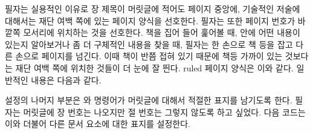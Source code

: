 필자는 실용적인 이유로 장 제목이 머릿글에 적어도 페이지 중앙에, 기술적인 저술에
대해서는 재단 여백 쪽에 있는 페이지 양식을 선호한다.
필자는 또한 페이지 번호가 바깥쪽 모서리에 위치하는 것을 선호한다.
책을 집어 들어 훑어볼 때, 안에 어떤 내용이 있는지 알아보거나 좀 더 구체적인
내용을 찾을 때, 필자는 한 손으로 책 등을 잡고 다른 손으로 페이지를 넘긴다.
이때 책이 반쯤 접혀 있기 때문에 책등 가까이 있는 것보다는 재단 여백 쪽에 위치한
것들이 더 눈에 잘 띈다.
ruled 페이지 양식은 이와 같다.
일반적인 내용은 다음과 같다.
\begin{lcode}
\end{lcode}
설정의 나머지 부분은 \cmd{\chapter}와 \cmd{\section} 명령어가 머릿글에 대해서
적절한 표지를 남기도록 한다.
필자는 머릿글에 장 번호는 나오지만 절 번호는 그렇지 않도록 하고 싶었다.
다음 코드는 이와 더불어 다른 문서 요소에 대한 표지를 설정한다.
\begin{lcode}
\end{lcode}

